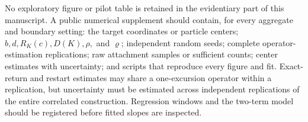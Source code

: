 \documentclass[11pt]{article}
\theoremstyle{mainthm}
\theoremstyle{definition}
\theoremstyle{remark}
\begin{document}
No exploratory figure or pilot table is retained in the evidentiary part of this manuscript. A public numerical supplement should contain, for every aggregate and boundary setting: the target coordinates or particle centers; $b,d,R_K(c),D(K),\rho,$ and $\varrho$; independent random seeds; complete operator-estimation replications; raw attachment samples or sufficient counts; center estimates with uncertainty; and scripts that reproduce every figure and fit. Exact-return and restart estimates may share a one-excursion operator within a replication, but uncertainty must be estimated across independent replications of the entire correlated construction. Regression windows and the two-term model should be registered before fitted slopes are inspected.

\printbibliography
\end{document}
